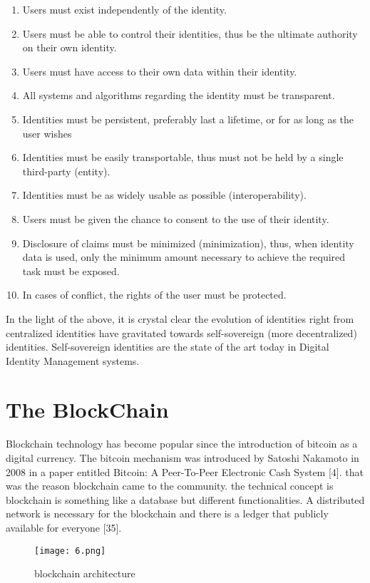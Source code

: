 \begin{enumerate}
    \item Users must exist independently of the identity.
    \item Users must be able to control their identities, thus be the ultimate authority on their own identity.
    \item Users must have access to their own data within their identity.
    \item All systems and algorithms regarding the identity must be transparent.
    \item Identities must be persistent, preferably last a lifetime, or for as long as the user wishes
    \item Identities must be easily transportable, thus must not be held by a single third-party (entity). 
    \item Identities must be as widely usable as possible (interoperability).
    \item Users must be given the chance to consent to the use of their identity. 
    \item Disclosure of claims must be minimized (minimization), thus, when identity data is used, only the minimum amount necessary to achieve the required task must be exposed.
    \item In cases of conflict, the rights of the user must be protected.
\end{enumerate}

In the light of the above, it is crystal clear the evolution of identities right from centralized identities have gravitated towards self-sovereign (more decentralized) identities. Self-sovereign identities are the state of the art today in Digital Identity Management systems.

\section{The BlockChain}

Blockchain technology has become popular since the introduction of bitcoin as a digital currency. The bitcoin mechanism was introduced by Satoshi Nakamoto in 2008 in a paper entitled Bitcoin: A Peer-To-Peer Electronic Cash System [4]. that was the reason blockchain came to the community. the technical concept is blockchain is something like a database but different functionalities.  A distributed network is necessary for the blockchain and there is a ledger that publicly available for everyone [35].

\begin{figure}[H]
    \centering
    \texttt{[image: 6.png]}
    \caption{blockchain architecture}
    \label{fig:threshold}
  \end{figure}

